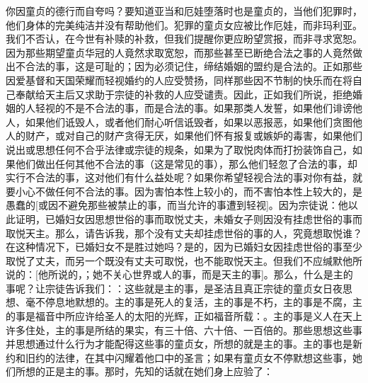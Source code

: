 你因童贞的德行而自夸吗？要知道亚当和厄娃堕落时也是童贞的，当他们犯罪时，他们身体的完美纯洁并没有帮助他们。犯罪的童贞女应被比作厄娃，而非玛利亚。我们不否认，在今世有补赎的补救，但我们提醒你更应盼望赏报，而非寻求宽恕。因为那些期望童贞华冠的人竟然求取宽恕，而那些甚至已断绝合法之事的人竟然做出不合法的事，这是可耻的；因为必须记住，缔结婚姻的盟约是合法的。正如那些因爱基督和天国荣耀而轻视婚约的人应受赞扬，同样那些因不节制的快乐而在将自己奉献给天主后又求助于宗徒的补救的人应受谴责。因此，正如我们所说，拒绝婚姻的人轻视的不是不合法的事，而是合法的事。如果那类人发誓，如果他们诽谤他人，如果他们诋毁人，或者他们耐心听信诋毁者，如果以恶报恶，如果他们贪图他人的财产，或对自己的财产贪得无厌，如果他们怀有报复或嫉妒的毒害，如果他们说出或思想任何不合乎法律或宗徒的规条，如果为了取悦肉体而打扮装饰自己，如果他们做出任何其他不合法的事（这是常见的事），那么他们轻忽了合法的事，却实行不合法的事，这对他们有什么益处呢？如果你希望轻视合法的事对你有益，就要小心不做任何不合法的事。因为害怕本性上较小的，而不害怕本性上较大的，是愚蠢的[或因不避免那些被禁止的事，而当允许的事遭到轻视]。因为宗徒说：他以此证明，已婚妇女因思想世俗的事而取悦丈夫，未婚女子则因没有挂虑世俗的事而取悦天主。那么，请告诉我，那个没有丈夫却挂虑世俗的事的人，究竟想取悦谁？在这种情况下，已婚妇女不是胜过她吗？是的，因为已婚妇女因挂虑世俗的事至少取悦了丈夫，而另一个既没有丈夫可取悦，也不能取悦天主。但我们不应缄默他所说的：[他所说的，；她不关心世界或人的事，而是天主的事]。那么，什么是主的事呢？让宗徒告诉我们：：这些就是主的事，是圣洁且真正宗徒的童贞女日夜思想、毫不停息地默想的。主的事是死人的复活，主的事是不朽，主的事是不腐，主的事是福音中所应许给圣人的太阳的光辉，正如福音所载：。主的事是义人在天上许多住处，主的事是所结的果实，有三十倍、六十倍、一百倍的。那些思想这些事并思想通过什么行为才能配得这些事的童贞女，所想的就是主的事。主的事也是新约和旧约的法律，在其中闪耀着他口中的圣言；如果有童贞女不停默想这些事，她们所想的正是主的事。那时，先知的话就在她们身上应验了：\par


